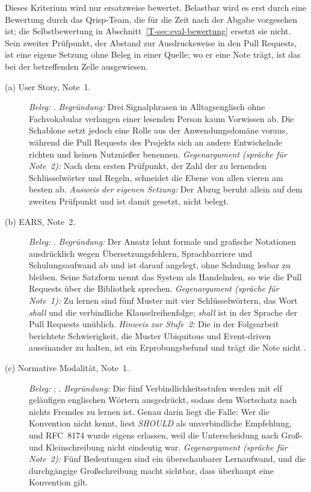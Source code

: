 \documentclass[11pt,a4paper]{report}
\begin{document}
Dieses Kriterium wird nur ersatzweise bewertet. Belastbar wird es erst
durch eine Bewertung durch das Qrisp-Team, die für die Zeit nach der
Abgabe vorgesehen ist; die Selbstbewertung in
Abschnitt~\ref{T-sec:eval-bewertung} ersetzt sie nicht. Sein zweiter
Prüfpunkt, der Abstand zur Ausdrucksweise in den Pull Requests, ist eine
eigene Setzung ohne Beleg in einer Quelle; wo er eine Note
trägt, ist das bei der betreffenden Zelle ausgewiesen.

\begin{description}
  \item[(a) User Story, Note~1.]
  \emph{Beleg:} \cite[Abschn.~1 und 2.2]{lucassen2016qus}.
  \emph{Begründung:} Drei Signalphrasen in Alltagsenglisch ohne
  Fachvokabular verlangen einer lesenden Person kaum Vorwissen ab. Die
  Schablone setzt jedoch eine Rolle aus der Anwendungsdomäne voraus,
  während die Pull Requests des Projekts sich an andere Entwickelnde
  richten und keinen Nutznießer benennen.
  \emph{Gegenargument (spräche für Note~2):} Nach dem ersten Prüfpunkt,
  der Zahl der zu lernenden Schlüsselwörter und Regeln, schneidet die
  Ebene von allen vieren am besten ab.
  \emph{Ausweis der eigenen Setzung:} Der Abzug beruht allein auf dem
  zweiten Prüfpunkt und ist damit gesetzt, nicht belegt.

  \item[(b) EARS, Note~2.]
  \emph{Beleg:} \cite[Abschn.~2 und 4.1--4.6]{mavin2009ears}.
  \emph{Begründung:} Der Ansatz lehnt formale und grafische Notationen
  ausdrücklich wegen Übersetzungsfehlern, Sprachbarriere und
  Schulungsaufwand ab und ist darauf angelegt, ohne Schulung lesbar zu
  bleiben. Seine Satzform nennt das System als Handelnden, so wie die
  Pull Requests über die Bibliothek sprechen.
  \emph{Gegenargument (spräche für Note~1):} Zu lernen sind fünf Muster
  mit vier Schlüsselwörtern, das Wort \emph{shall} und die verbindliche
  Klauselreihenfolge; \emph{shall} ist in der Sprache der Pull Requests
  unüblich.
  \emph{Hinweis zur Stufe~2:} Die in der Folgearbeit berichtete
  Schwierigkeit, die Muster Ubiquitous und Event-driven auseinander zu
  halten, ist ein Erprobungsbefund und trägt die Note nicht
  \cite[Abschn.~Lessons Learned Applying EARS]{mavin2010bigears}.

  \item[(c) Normative Modalität, Note~1.]
  \emph{Beleg:} \cite[Abschn.~1--5]{rfc2119};
  \cite[Abschn.~1 und 2]{rfc8174}.
  \emph{Begründung:} Die fünf Verbindlichkeitsstufen werden mit elf
  geläufigen englischen Wörtern ausgedrückt, sodass dem Wortschatz nach
  nichts Fremdes zu lernen ist. Genau darin liegt die Falle: Wer die
  Konvention nicht kennt, liest \emph{SHOULD} als unverbindliche
  Empfehlung, und RFC~8174 wurde eigens erlassen, weil die
  Unterscheidung nach Groß- und Kleinschreibung nicht eindeutig war.
  \emph{Gegenargument (spräche für Note~2):} Fünf Bedeutungen sind ein
  überschaubarer Lernaufwand, und die durchgängige Großschreibung macht
  sichtbar, dass überhaupt eine Konvention gilt.


\end{description}
\end{document}
